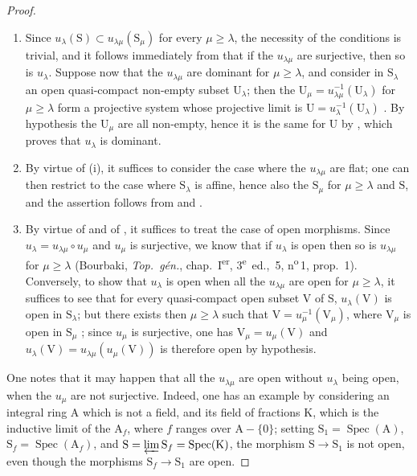 \begin{proof}
\begin{enumerate}[label=(\roman*)]
  \item Since $u_\lambda(\mathrm{S})\subset u_{\lambda\mu}(\mathrm{S}_\mu)$ for every $\mu\geqslant\lambda$, the necessity of the conditions is trivial, and it follows immediately from  that if the $u_{\lambda\mu}$ are surjective, then so is $u_\lambda$.
Suppose now that the $u_{\lambda\mu}$ are dominant for $\mu\geqslant\lambda$, and consider in $\mathrm{S}_\lambda$ an open quasi-compact non-empty subset $\mathrm{U}_\lambda$; then the $\mathrm{U}_\mu=u_{\lambda\mu}^{-1}(\mathrm{U}_\lambda)$ for $\mu\geqslant\lambda$ form a projective system whose projective limit is $\mathrm{U}=u_\lambda^{-1}(\mathrm{U}_\lambda)$ .
By hypothesis the $\mathrm{U}_\mu$ are all non-empty, hence it is the same for $\mathrm{U}$ by , which proves that $u_\lambda$ is dominant.

  \item By virtue of (i), it suffices to consider the case where the $u_{\lambda\mu}$ are flat; one can then restrict to the case where $\mathrm{S}_\lambda$ is affine, hence also the $\mathrm{S}_\mu$ for $\mu\geqslant\lambda$ and $\mathrm{S}$, and the assertion follows from  and .

  \item By virtue of  and of , it suffices to treat the case of open morphisms.
Since $u_\lambda=u_{\lambda\mu}\circ u_\mu$ and $u_\mu$ is surjective, we know that if $u_\lambda$ is open then so is $u_{\lambda\mu}$ for $\mu\geqslant\lambda$ (Bourbaki, \emph{Top.\ g\'{e}n.}, chap.~I\textsuperscript{er}, 3\textsuperscript{e}~ed., \textsection\,5, n\textsuperscript{o}\,1, prop.~1).
Conversely, to show that $u_\lambda$ is open when all the $u_{\lambda\mu}$ are open for $\mu\geqslant\lambda$, it suffices to see that for every quasi-compact open subset $\mathrm{V}$ of $\mathrm{S}$, $u_\lambda(\mathrm{V})$ is open in $\mathrm{S}_\lambda$; but there exists then $\mu\geqslant\lambda$ such that $\mathrm{V}=u_\mu^{-1}(\mathrm{V}_\mu)$, where $\mathrm{V}_\mu$ is open in $\mathrm{S}_\mu$ ; since $u_\mu$ is surjective, one has $\mathrm{V}_\mu=u_\mu(\mathrm{V})$ and $u_\lambda(\mathrm{V})=u_{\lambda\mu}(u_\mu(\mathrm{V}))$ is therefore open by hypothesis.
\end{enumerate}

One notes that it may happen that all the $u_{\lambda\mu}$ are open without $u_\lambda$ being open, when the $u_\mu$ are not surjective.
Indeed, one has an example by considering an integral ring $\mathrm{A}$ which is not a field, and its field of fractions $\mathrm{K}$, which is the inductive limit of the $\mathrm{A}_f$, where $f$ ranges over $\mathrm{A}-\{0\}$; setting $\mathrm{S}_1=\operatorname{Spec}(\mathrm{A})$, $\mathrm{S}_f=\operatorname{Spec}(\mathrm{A}_f)$, and $\mathrm{S}=\varprojlim\mathrm{S}_f=\operatorname{Spec}(\mathrm{K})$, the morphism $\mathrm{S}\to\mathrm{S}_1$ is not open, even though the morphisms $\mathrm{S}_f\to\mathrm{S}_1$ are open.
\end{proof}

